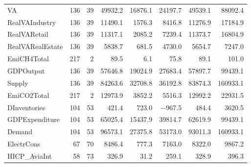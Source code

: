 {\begin{tabular}[t]{lrrrrrrr}
VA & 136 & 39 & \num{49932.2} & \num{16876.1} & \num{24197.7} & \num{49539.1} & \num{88092.4}\\
RealVAIndustry & 136 & 39 & \num{11490.1} & \num{1576.3} & \num{8416.8} & \num{11276.9} & \num{17184.9}\\
RealVARetail & 136 & 39 & \num{11317.1} & \num{2085.2} & \num{7239.4} & \num{11373.7} & \num{16804.9}\\
RealVARealEstate & 136 & 39 & \num{5838.7} & \num{681.5} & \num{4730.0} & \num{5654.7} & \num{7247.0}\\
EmiCH4Total & 217 & 2 & \num{89.5} & \num{6.1} & \num{75.8} & \num{89.1} & \num{101.0}\\
GDPOutput & 136 & 39 & \num{57646.8} & \num{19024.9} & \num{27683.4} & \num{57897.7} & \num{99439.1}\\
Supply & 136 & 39 & \num{84263.6} & \num{32708.8} & \num{36192.8} & \num{83874.3} & \num{160933.1}\\
EmiCO2Total & 217 & 2 & \num{12973.9} & \num{3852.2} & \num{5516.3} & \num{12992.2} & \num{22931.5}\\
DInventories & 104 & 53 & \num{421.4} & \num{723.0} & \num{-967.5} & \num{484.4} & \num{3620.5}\\
GDPExpenditure & 104 & 53 & \num{65025.4} & \num{15437.9} & \num{39814.7} & \num{62619.9} & \num{99439.1}\\
Demand & 104 & 53 & \num{96573.1} & \num{27375.8} & \num{53173.0} & \num{93011.3} & \num{160933.1}\\
ElectrCons & 67 & 70 & \num{8486.4} & \num{777.3} & \num{7163.0} & \num{8322.0} & \num{9867.2}\\
HICP\_AviaInt & 58 & 73 & \num{326.9} & \num{31.2} & \num{259.1} & \num{328.9} & \num{396.3}\\
\bottomrule
\end{tabular}}
